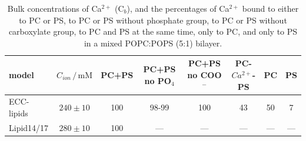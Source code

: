 \documentclass[journal=jpcbfk,manuscript=article]{achemso}
\begin{document}
 
\begin{table}[tb!] 
  \caption{Bulk concentrations of Ca$^{2+}$ (C$_b$), 
           and the percentages of Ca$^{2+}$ bound to 
           either to PC or PS, 
           to PC or PS without phosphate group,
           to PC or PS without carboxylate group,
           to PC and PS at the same time,
           only to PC, 
           and only to PS 
           in a mixed POPC:POPS (5:1) bilayer. 
          \label{tab:binding}} 
  \begin{tabular}{l| c | c c c c c c } 
    model                  & $C_{ion}\,/\,\mathrm{mM}$ & PC+PS  &  PC+PS no PO$_4$ & PC+PS no COO$^-$ & PC-$Ca^{2+}$-PS  & PC & PS  \\ 
    \hline 
    ECC-lipids             &  $240\pm 10 $             & 100    &   98-99          & 100              & 43               & 50 &  7  \\
    \hline 
    Lipid14/17             &  $280\pm 10 $             & 100    &   ---            & ---              & ---              & ---& --- \\
    \hline 
  \end{tabular} 
\end{table} 
 
 
 
 

 
 
\end{document}
